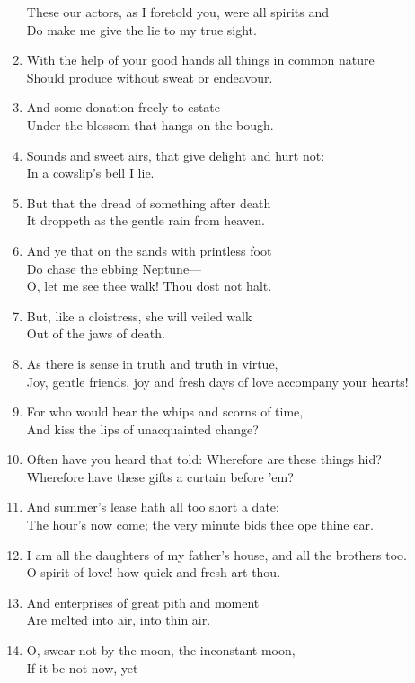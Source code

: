 \documentclass[17pt]{extarticle}
\begin{document}
\begin{enumerate}
  These our actors, as I foretold you, were all spirits and\\Do make me
  give the lie to my true sight.
\item
  With the help of your good hands all things in common nature\\Should
  produce without sweat or endeavour.
\item
  And some donation freely to estate\\Under the blossom that hangs on
  the bough.
\item
  Sounds and sweet airs, that give delight and hurt not:\\In a cowslip's
  bell I lie.
\item
  But that the dread of something after death\\It droppeth as the gentle
  rain from heaven.
\item
  And ye that on the sands with printless foot\\Do chase the ebbing
  Neptune---\\O, let me see thee walk! Thou dost not halt.
\item
  But, like a cloistress, she will veiled walk\\Out of the jaws of
  death.
\item
  As there is sense in truth and truth in virtue,\\Joy, gentle friends,
  joy and fresh days of love accompany your hearts!
\item
  For who would bear the whips and scorns of time,\\And kiss the lips of
  unacquainted change?
\item
  Often have you heard that told: Wherefore are these things
  hid?\\Wherefore have these gifts a curtain before 'em?
\item
  And summer's lease hath all too short a date:\\The hour's now come;
  the very minute bids thee ope thine ear.
\item
  I am all the daughters of my father's house, and all the brothers
  too.\\O spirit of love! how quick and fresh art thou.
\item
  And enterprises of great pith and moment\\Are melted into air, into
  thin air.
\item
  O, swear not by the moon, the inconstant moon,\\If it be not now, yet

\end{enumerate}
\end{document}
